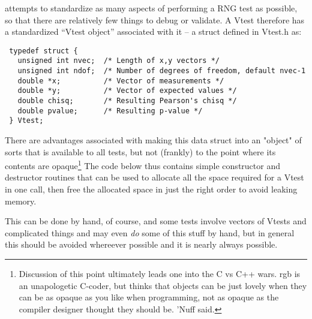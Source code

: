 \documentclass{book}
\begin{document}
\die attempts to standardize as many aspects of performing a RNG test as
possible, so that there are relatively few things to debug or validate.
A Vtest therefore has a standardized ``Vtest object'' associated with it
-- a struct defined in Vtest.h as:

\begin{verbatim}
 typedef struct {
   unsigned int nvec;  /* Length of x,y vectors */
   unsigned int ndof;  /* Number of degrees of freedom, default nvec-1
   double *x;          /* Vector of measurements */
   double *y;          /* Vector of expected values */
   double chisq;       /* Resulting Pearson's chisq */
   double pvalue;      /* Resulting p-value */
 } Vtest;
\end{verbatim}

There are advantages associated with making this data struct into an
"object" of sorts that is available to all tests, but not (frankly) to
the point where its contents are opaque\footnote{Discussion of this
point ultimately leads one into the C vs C++ wars.  rgb is an
unapologetic C-coder, but thinks that objects can be just lovely when
they can be as opaque as you like when programming, not as opaque as the
compiler designer thought they should be.  'Nuff said.} The code below
thus contains simple constructor and destructor routines that can be
used to allocate all the space required for a Vtest in one call, then
free the allocated space in just the right order to avoid leaking
memory.  

This can be done by hand, of course, and some tests involve vectors of
Vtests and complicated things and may even {\em do} some of this stuff
by hand, but in general this should be avoided whereever possible and it
is nearly always possible.
\end{document}
